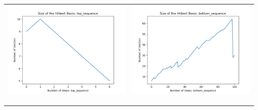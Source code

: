 \documentclass[10pt]{article}
\begin{document}
\begin{tabular}{c|c}
\begin{minipage}{.45\textwidth}
\includegraphics[width=\textwidth]{"DATA/5d/5 generators 2 bound B/top_sequence SIZE"}
\end{minipage} &
\begin{minipage}{.45\textwidth}
\includegraphics[width=\textwidth]{"DATA/5d/5 generators 2 bound B bottomup/bottom_sequence SIZE"}
\end{minipage} \\ \\
\hline \\\begin{minipage}{.45\textwidth}

\end{minipage}
\end{tabular}
\end{document}

